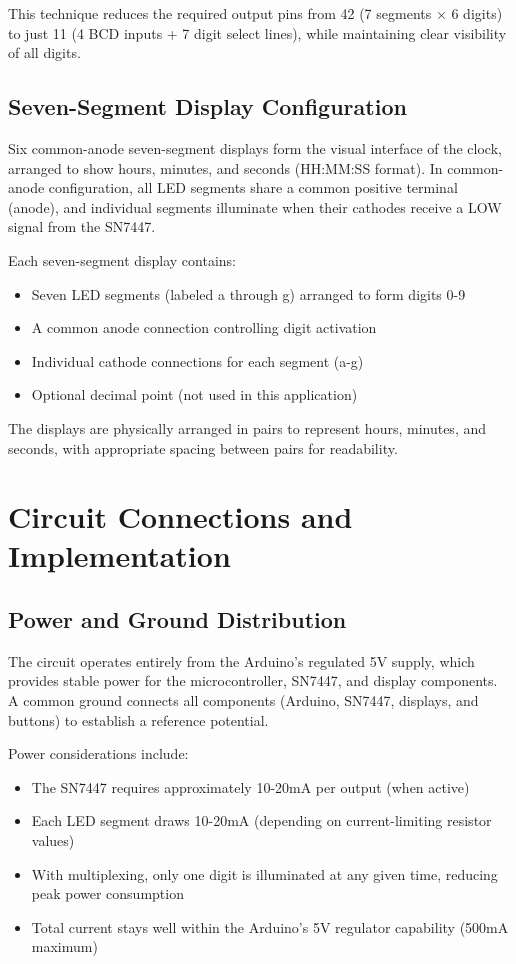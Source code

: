 \documentclass{article}
\begin{document}
This technique reduces the required output pins from 42 (7 segments × 6 digits) to just 11 (4 BCD inputs + 7 digit select lines), while maintaining clear visibility of all digits.

\subsection{Seven-Segment Display Configuration}
Six common-anode seven-segment displays form the visual interface of the clock, arranged to show hours, minutes, and seconds (HH:MM:SS format). In common-anode configuration, all LED segments share a common positive terminal (anode), and individual segments illuminate when their cathodes receive a LOW signal from the SN7447.

Each seven-segment display contains:
\begin{itemize}
\item Seven LED segments (labeled a through g) arranged to form digits 0-9
\item A common anode connection controlling digit activation
\item Individual cathode connections for each segment (a-g)
\item Optional decimal point (not used in this application)
\end{itemize}

The displays are physically arranged in pairs to represent hours, minutes, and seconds, with appropriate spacing between pairs for readability.

\section{Circuit Connections and Implementation}

\subsection{Power and Ground Distribution}
The circuit operates entirely from the Arduino's regulated 5V supply, which provides stable power for the microcontroller, SN7447, and display components. A common ground connects all components (Arduino, SN7447, displays, and buttons) to establish a reference potential.

Power considerations include:
\begin{itemize}
\item The SN7447 requires approximately 10-20mA per output (when active)
\item Each LED segment draws 10-20mA (depending on current-limiting resistor values)
\item With multiplexing, only one digit is illuminated at any given time, reducing peak power consumption
\item Total current stays well within the Arduino's 5V regulator capability (500mA maximum)
\end{itemize}
\end{document}
